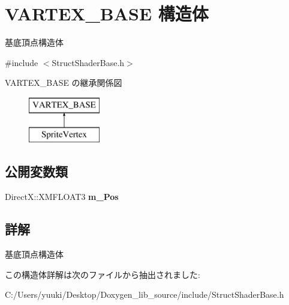 \hypertarget{struct_d3_d11_1_1_graphic_1_1_v_a_r_t_e_x___b_a_s_e}{}\section{V\+A\+R\+T\+E\+X\+\_\+\+B\+A\+SE 構造体}
\label{struct_d3_d11_1_1_graphic_1_1_v_a_r_t_e_x___b_a_s_e}


基底頂点構造体  




{\ttfamily \#include $<$Struct\+Shader\+Base.\+h$>$}

V\+A\+R\+T\+E\+X\+\_\+\+B\+A\+SE の継承関係図\begin{figure}[H]
\begin{center}
\leavevmode
\includegraphics[height=2.000000cm]{struct_d3_d11_1_1_graphic_1_1_v_a_r_t_e_x___b_a_s_e}
\end{center}
\end{figure}
\subsection*{公開変数類}
\begin{DoxyCompactItemize}
\item 
Direct\+X\+::\+X\+M\+F\+L\+O\+A\+T3 {\bfseries m\+\_\+\+Pos}\hypertarget{struct_d3_d11_1_1_graphic_1_1_v_a_r_t_e_x___b_a_s_e_ac4dfe78085ef0a056c1ec0b18bbf894b}{}\label{struct_d3_d11_1_1_graphic_1_1_v_a_r_t_e_x___b_a_s_e_ac4dfe78085ef0a056c1ec0b18bbf894b}

\end{DoxyCompactItemize}


\subsection{詳解}
基底頂点構造体 

この構造体詳解は次のファイルから抽出されました\+:\begin{DoxyCompactItemize}
\item 
C\+:/\+Users/yuuki/\+Desktop/\+Doxygen\+\_\+lib\+\_\+source/include/Struct\+Shader\+Base.\+h\end{DoxyCompactItemize}
